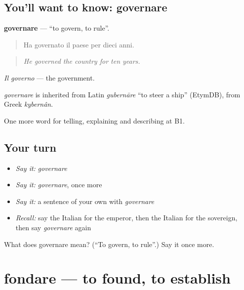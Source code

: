 \subsection*{You'll want to know: governare}
\textbf{governare} — \textquotedblleft{}to govern, to rule\textquotedblright{}.

\begin{quote}
Ha governato il paese per dieci anni.
\end{quote}

\begin{quote}
\emph{He governed the country for ten years.}
\end{quote}

\emph{Il governo} — the government.

\begin{cousinweb}
\emph{governare} is inherited from Latin \emph{gubernāre} \textquotedblleft{}to steer a ship\textquotedblright{} (EtymDB), from Greek \emph{kybernân}.
\end{cousinweb}

\begin{grammarlens}[title={What you've built}]
One more word for telling, explaining and describing at B1.
\end{grammarlens}

\subsection*{Your turn}
\begin{itemize}
\raggedright
  \item \emph{Say it:} \emph{governare}
  \item \emph{Say it:} \emph{governare}, once more
  \item \emph{Say it:} a sentence of your own with \emph{governare}
  \item \emph{Recall:} say the Italian for the emperor, then the Italian for the sovereign, then say \emph{governare} again
\end{itemize}

\begin{tcolorbox}[breakable,colback=teal!4,colframe=teal!35!black,title={Before you move on}]
What does governare mean? (\textquotedblleft{}To govern, to rule\textquotedblright{}.) Say it once more.
\end{tcolorbox}
\section[fondare]{fondare — to found, to establish}

